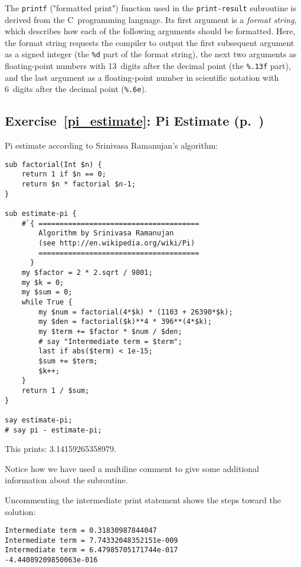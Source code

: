 The {\tt printf} ("formatted print") function used in 
the {\tt print-result} subroutine is derived from the 
C~programming language. Its first argument is a 
\emph{format string}, which describes how each of 
the following arguments should be formatted. Here, the 
format string requests the compiler to output the 
first subsequent argument as a signed integer (the 
\verb'%d' part of the format string), the 
next two arguments as floating-point numbers with
13~digits after the decimal point (the \verb'%.13f' part), and 
the last argument as a floating-point number in scientific 
notation with 6~digits after the decimal point (\verb'%.6e').



\subsection{Exercise~\ref{pi_estimate}: Pi Estimate (p.~\pageref{pi_estimate})}
\label{sol_pi_estimate}

Pi estimate according to Srinivasa Ramanujan's algorithm:


\begin{verbatim}
sub factorial(Int $n) {
    return 1 if $n == 0;
    return $n * factorial $n-1;
}

sub estimate-pi {
    #`{ ======================================
        Algorithm by Srinivasa Ramanujan 
        (see http://en.wikipedia.org/wiki/Pi)
        ======================================
      }
    my $factor = 2 * 2.sqrt / 9801;
    my $k = 0;
    my $sum = 0;
    while True {
        my $num = factorial(4*$k) * (1103 + 26390*$k);
        my $den = factorial($k)**4 * 396**(4*$k);
        my $term += $factor * $num / $den;
        # say "Intermediate term = $term";
        last if abs($term) < 1e-15;
        $sum += $term;
        $k++;
    }
    return 1 / $sum;
}

say estimate-pi;
# say pi - estimate-pi;
\end{verbatim}

This prints: 3.14159265358979.

Notice how we have used a multiline comment to 
give some additional information about the subroutine.

Uncommenting the intermediate print statement shows the 
steps toward the solution:

\begin{verbatim}
Intermediate term = 0.31830987844047
Intermediate term = 7.74332048352151e-009
Intermediate term = 6.47985705171744e-017
-4.44089209850063e-016
\end{verbatim}

